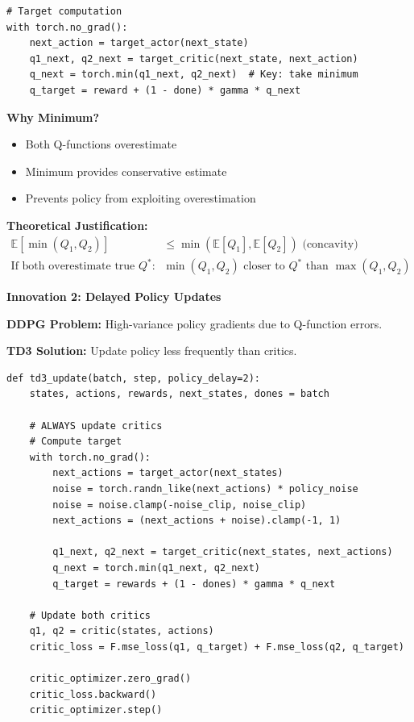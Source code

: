 \documentclass[12pt]{article}
\begin{document}
{{\begin{verbatim}
# Target computation
with torch.no_grad():
    next_action = target_actor(next_state)
    q1_next, q2_next = target_critic(next_state, next_action)
    q_next = torch.min(q1_next, q2_next)  # Key: take minimum
    q_target = reward + (1 - done) * gamma * q_next
\end{verbatim}

\textbf{Why Minimum?}
\begin{itemize}
\item Both Q-functions overestimate
\item Minimum provides conservative estimate
\item Prevents policy from exploiting overestimation
\end{itemize}

\textbf{Theoretical Justification:}
\begin{align}
\mathbb{E}[\min(Q_1, Q_2)] &\leq \min(\mathbb{E}[Q_1], \mathbb{E}[Q_2]) \text{ (concavity)} \\
\text{If both overestimate true } Q^*: \quad &\min(Q_1, Q_2) \text{ closer to } Q^* \text{ than } \max(Q_1, Q_2)
\end{align}

\textbf{Innovation 2: Delayed Policy Updates}

\textbf{DDPG Problem:} High-variance policy gradients due to Q-function errors.

\textbf{TD3 Solution:} Update policy less frequently than critics.

\begin{verbatim}
def td3_update(batch, step, policy_delay=2):
    states, actions, rewards, next_states, dones = batch
    
    # ALWAYS update critics
    # Compute target
    with torch.no_grad():
        next_actions = target_actor(next_states)
        noise = torch.randn_like(next_actions) * policy_noise
        noise = noise.clamp(-noise_clip, noise_clip)
        next_actions = (next_actions + noise).clamp(-1, 1)
        
        q1_next, q2_next = target_critic(next_states, next_actions)
        q_next = torch.min(q1_next, q2_next)
        q_target = rewards + (1 - dones) * gamma * q_next
    
    # Update both critics
    q1, q2 = critic(states, actions)
    critic_loss = F.mse_loss(q1, q_target) + F.mse_loss(q2, q_target)
    
    critic_optimizer.zero_grad()
    critic_loss.backward()
    critic_optimizer.step()
    

\end{verbatim}}}
\end{document}
